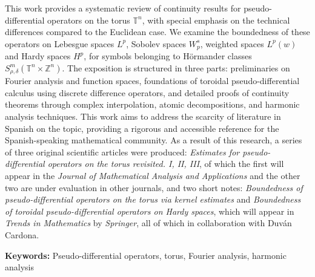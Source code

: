 \vspace{0.5in}
		This work provides a systematic review of continuity results for pseudo-differential operators on the torus $\mathbb{T}^n$, with special emphasis on the technical differences compared to the Euclidean case. We examine the boundedness of these operators on Lebesgue spaces $L^p$, Sobolev spaces $W^s_p$, weighted spaces $L^p(w)$ and Hardy spaces $H^p$, for symbols belonging to Hörmander classes $S^m_{\rho,\delta}(\mathbb{T}^n \times \mathbb{Z}^n)$. The exposition is structured in three parts: preliminaries on Fourier analysis and function spaces, foundations of toroidal pseudo-differential calculus using discrete difference operators, and detailed proofs of continuity theorems through complex interpolation, atomic decompositions, and harmonic analysis techniques. This work aims to address the scarcity of literature in Spanish on the topic, providing a rigorous and accessible reference for the Spanish-speaking mathematical community. As a result of this research, a series of three original scientific articles were produced: \textit{Estimates for pseudo-differential operators on the torus revisited. I, II, III}, of which the first will appear in the \textit{Journal of Mathematical Analysis and Applications} and the other two are under evaluation in other journals, and two short notes: \textit{Boundedness of pseudo-differential operators on the torus via kernel estimates} and \textit{Boundedness of toroidal pseudo-differential operators on Hardy spaces}, which will appear in \textit{Trends in Mathematics} by \textit{Springer}, all of which in collaboration with Duván Cardona.
		
		\textbf{Keywords:} Pseudo-differential operators, torus, Fourier analysis, harmonic analysis

